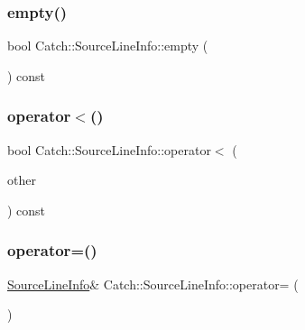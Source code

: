 \subsubsection{\texorpdfstring{empty()}{empty()}}
{\footnotesize\ttfamily bool Catch\+::\+Source\+Line\+Info\+::empty (\begin{DoxyParamCaption}{ }\end{DoxyParamCaption}) const\hspace{0.3cm}{\ttfamily [noexcept]}}

\mbox{\label{structCatch_1_1SourceLineInfo_af77415416919d2d6030b4be085b92f7a}} 
\subsubsection{\texorpdfstring{operator$<$()}{operator<()}}
{\footnotesize\ttfamily bool Catch\+::\+Source\+Line\+Info\+::operator$<$ (\begin{DoxyParamCaption}\item[{\mbox{\hyperlink{structCatch_1_1SourceLineInfo}{Source\+Line\+Info}} const \&}]{other }\end{DoxyParamCaption}) const\hspace{0.3cm}{\ttfamily [noexcept]}}

\mbox{\label{structCatch_1_1SourceLineInfo_a1a6cfc0197357ef4e329bb256aa8a354}} 
\subsubsection{\texorpdfstring{operator=()}{operator=()}\hspace{0.1cm}{\footnotesize\ttfamily [1/2]}}
{\footnotesize\ttfamily \mbox{\hyperlink{structCatch_1_1SourceLineInfo}{Source\+Line\+Info}}\& Catch\+::\+Source\+Line\+Info\+::operator= (\begin{DoxyParamCaption}\item[{\mbox{\hyperlink{structCatch_1_1SourceLineInfo}{Source\+Line\+Info}} const \&}]{ }\end{DoxyParamCaption})\hspace{0.3cm}{\ttfamily [default]}}

